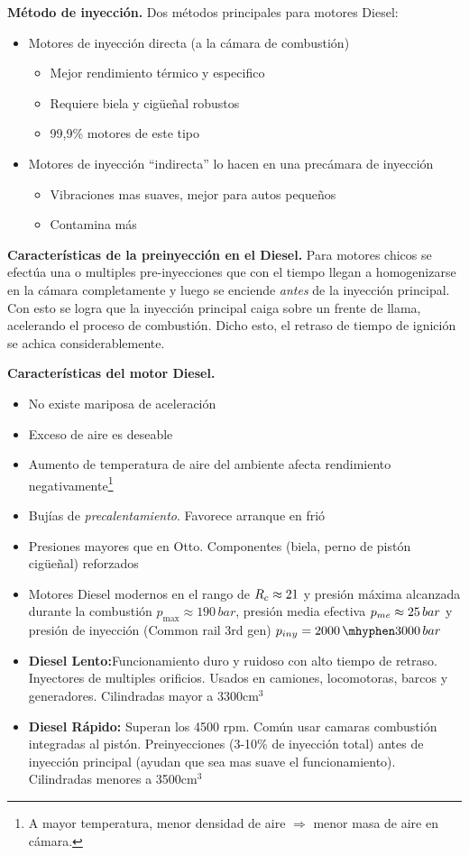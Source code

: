 \textbf{Método de inyección.}
Dos métodos principales para motores Diesel:
\begin{itemize}
    \item Motores de inyección directa (a la cámara de combustión)
    \begin{itemize}
        \item Mejor rendimiento térmico y especifico
        \item Requiere biela y cigüeñal robustos
        \item 99,9\% motores de este tipo
    \end{itemize}
    \item Motores de inyección ``indirecta'' lo hacen en una precámara de inyección
    \begin{itemize}
        \item Vibraciones mas suaves, mejor para autos pequeños
        \item Contamina más
    \end{itemize}
\end{itemize}

\textbf{Características de la preinyección en el Diesel.} Para motores chicos se efectúa una o multiples pre-inyecciones que con el tiempo llegan a homogenizarse en la cámara completamente y luego se enciende \textit{antes} de la inyección principal. Con esto se logra que la inyección principal caiga sobre un frente de llama, acelerando el proceso de combustión. Dicho esto, el retraso de tiempo de ignición se achica considerablemente.

{\bf Características del motor Diesel.}
\begin{itemize}
    \item No existe mariposa de aceleración
    \item Exceso de aire es deseable
    \item Aumento de temperatura de aire del ambiente afecta rendimiento negativamente\footnote{A mayor temperatura, menor densidad de aire $\Rightarrow$ menor masa de aire en cámara.}
    \item Bujías de \emph{precalentamiento}. Favorece arranque en frió
    \item Presiones mayores que en Otto. Componentes (biela, perno de pistón cigüeñal) reforzados
    \item Motores Diesel modernos en el rango de $R_c\approx 21$ y presión máxima alcanzada durante la combustión $p_{\max}\approx 190\,bar$, presión media efectiva $p_{me}\approx 25\, bar$ y presión de inyección (Common rail 3rd gen) $p_{iny}=2000\,\mhyphen 3000\, bar$
    \item \textbf{Diesel Lento:}Funcionamiento duro y ruidoso con alto tiempo de retraso. Inyectores de multiples orificios. Usados en camiones, locomotoras, barcos y generadores. Cilindradas mayor a 3300cm$^3$ 
    \item \textbf{Diesel Rápido:} Superan los 4500 rpm. Común usar camaras combustión integradas al pistón. Preinyecciones (3-10\% de inyección total) antes de inyección principal (ayudan que sea mas suave el funcionamiento). Cilindradas menores a 3500cm$^3$ 
\end{itemize}

